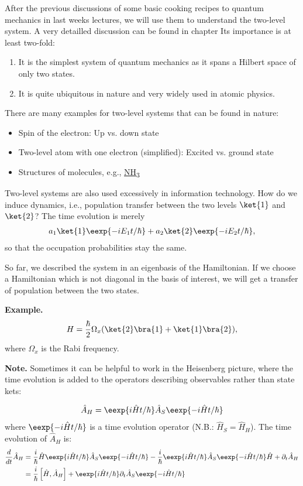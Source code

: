 After the previous discussions of some basic cooking recipes to quantum mechanics in last weeks lectures, we will use them to understand the two-level system. A very detailled discussion can be found in chapter  Its importance is at least two-fold:
\begin{enumerate}
\item It is the simplest system of quantum mechanics as it spans a Hilbert space of only two states.
\item It is quite ubiquitous in nature and very widely used in atomic physics.
\end{enumerate}



There are many examples for two-level systems that can be found in nature:
\begin{itemize}
	\item Spin of the electron: Up vs. down state
	\item Two-level atom with one electron (simplified): Excited vs. ground state
	\item Structures of molecules, e.g., \hyperref[fig:twostate]{NH\textsubscript{3}}
\end{itemize}
Two-level systems are also used excessively in information technology.
How do we induce dynamics, i.e., population transfer between the two levels $\ket{1}$ and $\ket{2}$? The time evolution is merely
		\begin{align}
			a_1\ket{1}\eexp{-i{E_1 t}/{\hbar}} + a_2\ket{2}\eexp{-i{E_2 t}/{\hbar}},
		\end{align}
		so that the occupation probabilities stay the same. 
		
		So far, we described the system in an eigenbasis of the Hamiltonian.
		If we choose a Hamiltonian which is not diagonal in the basis of interest, we will get a transfer of population between the two states.

\textbf{Example.}
\begin{align}
 H=\frac{\hbar}{2}\Omega_x(\ket{2}\bra{1} + \ket{1}\bra{2}),
\end{align}
where $\Omega_x$ is the Rabi frequency.

\textbf{Note.} Sometimes it can be helpful to work in the Heisenberg picture, where the time evolution is added to the operators describing observables rather than state kets:

\begin{align}
	\hat{A}_H=\eexp{i{\hat{H} t}/{\hbar}} \hat{A}_S \eexp{-i{\hat{H} t}/{\hbar}}
\end{align}
where $\eexp{-i{\hat{H} t}/{\hbar}}$ is a time evolution operator (N.B.: $\hat{H}_S = \hat{H}_H$). The time evolution of $\hat{A}_H$ is:
\begin{align}
 \notag \frac{d}{dt} \hat{A}_H &= \frac{i}{\hbar}\hat{H}\eexp{i{\hat{H}t}/{\hbar}}\hat{A}_S \eexp{-i{\hat{H} t}/{\hbar}}-\frac{i}{\hbar} \eexp{i{\hat{H} t}/{\hbar}}\hat{A}_S \eexp{-i{\hat{H}t}/{\hbar}}\hat{H}+\partial_t\hat{A}_H\\
&= \frac{i}{\hbar}\left[\hat{H},\hat{A}_H\right] + \eexp{i{\hat{H}t}/{\hbar}}\partial_t\hat{A}_S\eexp{-i{\hat{H}t}/{\hbar}}
 \end{align}

